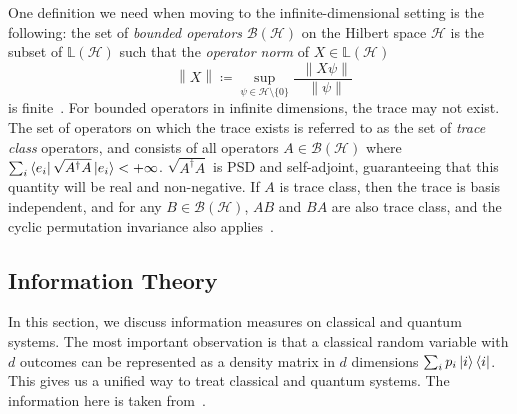 \documentclass[10pt, a4paper]{article}
\numberwithin{equation}{section} %
\theoremstyle{definition}
\theoremstyle{plain}
\newcommand{\norm}[1]{\mathop{}\left\lVert#1\right\rVert}
\newcommand{\?}{\mathrel{?}} %
\newcommand{\Lin}[1]{\mathbb{L}\left(#1\right)}
\newcommand{\Hs}{\mathcal{H}} %
\begin{document}
\begin{appendices}
                          One definition we need when moving to the infinite-dimensional setting is the following: the set of \emph{bounded operators} \(\mathcal{B}(\Hs)\) on the Hilbert space \(\Hs\) is the subset of \(\Lin{\Hs}\) such that the \emph{operator norm} of \(X \in \Lin{\Hs}\)
                          \begin{equation}
                            \norm{X} \coloneqq \sup_{\psi \in \Hs \setminus \{0\}} \frac{\norm{X\psi}}{\norm{\psi}}
                          \end{equation}
                          is finite~\cite{HallQuantumForMath}. For bounded operators in infinite dimensions, the trace may not exist. The set of operators on which the trace exists is referred to as the set of \emph{trace class} operators, and consists of all operators \(A \in \mathcal{B}(\Hs)\) where \(\sum_i \bra{e_i}\sqrt{A^{\dagger}A}\ket{e_i} < +\infty\). \(\sqrt{A^{\dagger}A}\) is PSD and self-adjoint, guaranteeing that this quantity will be real and non-negative. If \(A\) is trace class, then the trace is basis independent, and for any \(B \in \mathcal{B}(\Hs)\), \(AB\) and \(BA\) are also trace class, and the cyclic permutation invariance also applies~\cite[Sec. 19.2]{HallQuantumForMath}.

                          \subsection{Information Theory}\label{sec:prelim_infot}

                          In this section, we discuss information measures on classical and quantum systems. The most important observation is that a classical random variable with \(d\) outcomes can be represented as a density matrix in \(d\) dimensions \(\sum_i p_i \ket{i}\bra{i}\). This gives us a unified way to treat classical and quantum systems. The information here is taken from~\cite{NielsenChuang,ElemInfo}.


\end{appendices}
\end{document}
